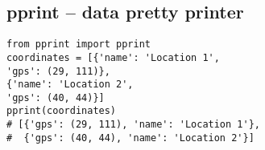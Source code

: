 %

\subsection{pprint -- data pretty printer}
\begin{verbatim}
from pprint import pprint
coordinates = [{'name': 'Location 1',
'gps': (29, 111)},
{'name': 'Location 2',
'gps': (40, 44)}]
pprint(coordinates)
# [{'gps': (29, 111), 'name': 'Location 1'},
#  {'gps': (40, 44), 'name': 'Location 2'}]
\end{verbatim}

%
